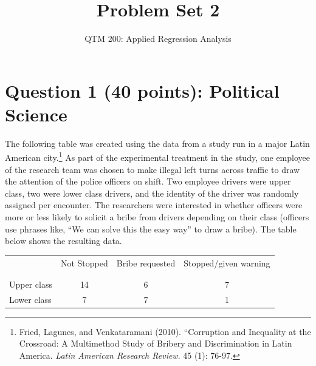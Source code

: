 \documentclass[12pt,letterpaper]{article}
\title{Problem Set 2}
\author{QTM 200: Applied Regression Analysis}
\begin{document}
	\maketitle
	\section*{Question 1 (40 points): Political Science}
		\vspace{.25cm}
	The following table was created using the data from a study run in a major Latin American city.\footnote{Fried, Lagunes, and Venkataramani (2010). ``Corruption and Inequality at the Crossroad: A Multimethod Study of Bribery and Discrimination in Latin America. \textit{Latin American Research Review}. 45 (1): 76-97.} As part of the experimental treatment in the study, one employee of the research team was chosen to make illegal left turns across traffic to draw the attention of the police officers on shift. Two employee drivers were upper class, two were lower class drivers, and the identity of the driver was randomly assigned per encounter. The researchers were interested in whether officers were more or less likely to solicit a bribe from drivers depending on their class (officers use phrases like, ``We can solve this the easy way'' to draw a bribe). The table below shows the resulting data.

\begin{table}[h!]
	\centering
	\begin{tabular}{l | c c c }
		& Not Stopped & Bribe requested & Stopped/given warning \\
		\\[-1.8ex] 
		\hline \\[-1.8ex]
		Upper class & 14 & 6 & 7 \\
		Lower class & 7 & 7 & 1 \\
		\hline
	\end{tabular}
\end{table}
\end{document}
